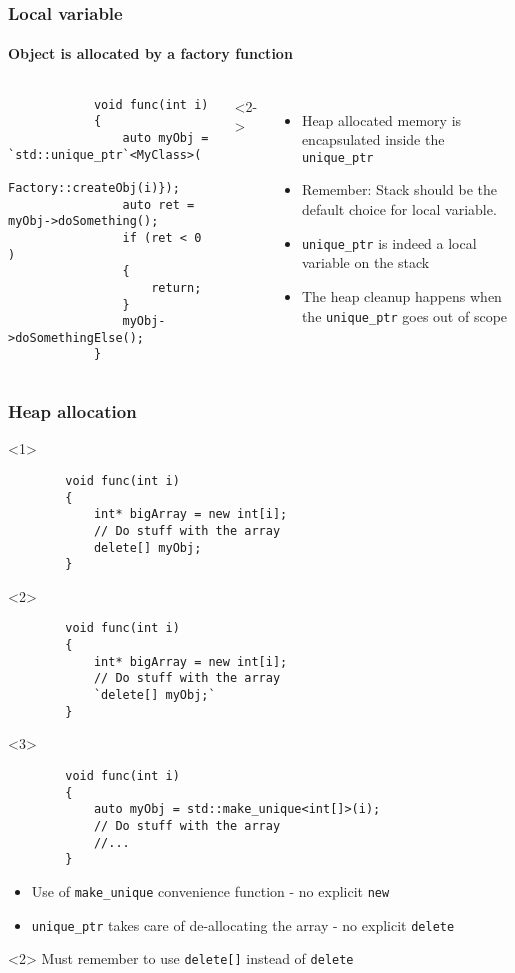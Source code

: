\documentclass{beamer}
\begin{document}
\begin{frame}[fragile,t]
\frametitle{Local variable}
\framesubtitle{Object is allocated by a factory function}
	\begin{columns}[t]
		\begin{lstlisting}
			void func(int i)
			{
				auto myObj = `std::unique_ptr`<MyClass>(
					Factory::createObj(i)});
				auto ret = myObj->doSomething();
				if (ret < 0 )
				{
					return;
				}
				myObj->doSomethingElse();
			}
		\end{lstlisting}
	<2->
		\begin{itemize}
			\item<2-> Heap allocated memory is encapsulated inside the \texttt{unique\_ptr}
			\item<3-> Remember: Stack should be the default choice for local variable.
			\item<4-> \texttt{unique\_ptr} is indeed a local variable on the stack
			\item<5-> The heap cleanup happens when the \texttt{unique\_ptr} goes out of scope
		\end{itemize}
	\end{columns}
\end{frame}

\begin{frame}[fragile,t]
\frametitle{Heap allocation}
	\begin{onlyenv}
	\begin{lstlisting}
		void func(int i)
		{
			int* bigArray = new int[i];
			// Do stuff with the array
			delete[] myObj;
		}
	\end{lstlisting}
	\end{onlyenv}
	
    \begin{onlyenv}<2>
	\begin{lstlisting}
		void func(int i)
		{
			int* bigArray = new int[i];
			// Do stuff with the array
			`delete[] myObj;`
		}
	\end{lstlisting}
	\end{onlyenv}

    \begin{onlyenv}<3>
	\begin{lstlisting}
		void func(int i)
		{
			auto myObj = std::make_unique<int[]>(i);
			// Do stuff with the array
			//...
		}
	\end{lstlisting}

	\begin{itemize}
		\item Use of \texttt{make\_unique} convenience function - no explicit \texttt{new}
		\item \texttt{unique\_ptr} takes care of de-allocating the array - no explicit \texttt{delete}
	\end{itemize}	
	\end{onlyenv}

	\begin{block}{}<2>
		Must remember to use \texttt{delete[]} instead of \texttt{delete}
	\end{block}
	
\end{frame}
\end{document}
